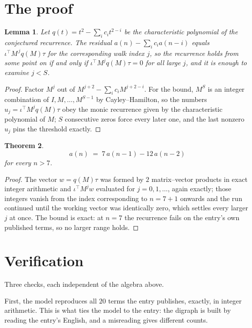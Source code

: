 \documentclass[11pt,a4paper]{article}
\theoremstyle{plain}
\newtheorem{theorem}{Theorem}
\newtheorem{lemma}[theorem]{Lemma}
\theoremstyle{definition}
\begin{document}
\section{The proof}

\begin{lemma}\label{lem:crit}
Let $q(t)=t^{2}-\sum_i c_it^{2-i}$ be the characteristic polynomial of the
conjectured recurrence. The residual $a(n)-\sum_ic_ia(n-i)$ equals
$\iota^{\!\top}M^{\,j}q(M)\tau$ for the corresponding walk index $j$, so the recurrence
holds from some point on if and only if $\iota^{\!\top}M^{j}q(M)\tau=0$ for all large $j$,
and it is enough to examine $j<S$.
\end{lemma}

\begin{proof}
Factor $M^{j}$ out of $M^{j+2}-\sum_ic_iM^{j+2-i}$. For the bound, $M^{S}$
is an integer combination of $I,M,\dots,M^{S-1}$ by Cayley--Hamilton, so the numbers
$u_j=\iota^{\!\top}M^{j}q(M)\tau$ obey the monic recurrence given by the characteristic
polynomial of $M$; $S$ consecutive zeros force every later one, and the last nonzero $u_j$
pins the threshold exactly.
\end{proof}

\begin{theorem}
\[
a(n)\;=\;7\,a(n-1) - 12\,a(n-2)
\]
for every $n>7$.
\end{theorem}

\begin{proof}
The vector $w=q(M)\tau$ was formed by $2$ matrix--vector products in exact integer
arithmetic and $\iota^{\!\top}M^{j}w$ evaluated for $j=0,1,\dots$, again exactly; those
integers vanish from the index corresponding to $n=7+1$ onwards and the run continued
until the working vector was identically zero, which settles every larger $j$ at once. The bound is exact: at $n=7$ the recurrence fails on the entry's own published terms, so no larger range holds.
\end{proof}

\section{Verification}

Three checks, each independent of the algebra above.

First, the model reproduces all $20$ terms the entry publishes, exactly, in integer
arithmetic. This is what ties the model to the entry: the digraph is built by reading the
entry's English, and a misreading gives different counts.
\end{document}
